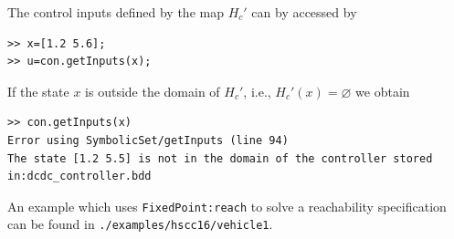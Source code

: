 \documentclass[a4paper]{amsart}
\renewcommand{\emptyset}{{\varnothing}}
\begin{document}
The control inputs defined by the map $H_c'$ can by accessed by 
\begin{lstlisting}[basicstyle=\footnotesize\ttfamily]
>> x=[1.2 5.6];
>> u=con.getInputs(x);
\end{lstlisting}
If the state $x$ is outside the domain of $H_c'$, i.e., $H_c'(x)=\emptyset$ we obtain
\begin{lstlisting}[basicstyle=\footnotesize\ttfamily]
>> con.getInputs(x)  
Error using SymbolicSet/getInputs (line 94)
The state [1.2 5.5] is not in the domain of the controller stored in:dcdc_controller.bdd
\end{lstlisting}

An example which uses {\tt\small FixedPoint:reach} to solve a reachability specification can be found in {\tt\small ./examples/hscc16/vehicle1}.
\end{document}
